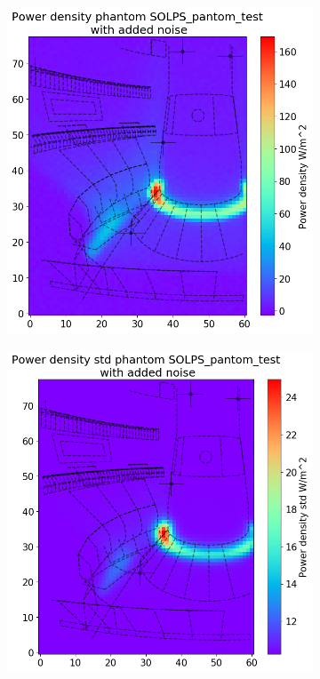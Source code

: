 \begin{figure}
     \begin{subfigure}{0.45\linewidth}
         \centering
         \includegraphics[trim={0 0 0 45},clip,width=\textwidth]{Chapters/chapter2/figs/inversion_comparison_foil_power_SOLPS_pantom_test.png}
         \caption{}
         \label{fig:SOLPS_phantom1a}
     \end{subfigure}
     \hfill
     \begin{subfigure}{0.45\linewidth}
         \centering
         \includegraphics[trim={0 0 0 45},clip,width=\textwidth]{Chapters/chapter2/figs/inversion_comparison_foil_power_std_SOLPS_pantom_test.png}

\end{subfigure}
\end{figure}
